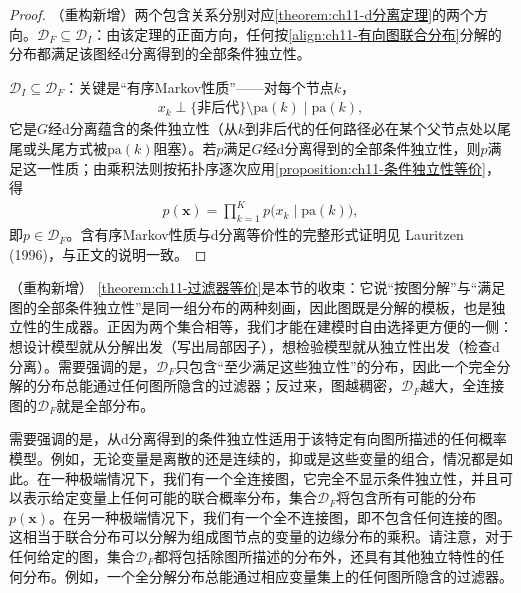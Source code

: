 \documentclass[../../main.tex]{subfiles}
\begin{document}
\begin{proof}
（重构新增）两个包含关系分别对应\cref{theorem:ch11-d分离定理}的两个方向。$\mathcal{D}_F\subseteq\mathcal{D}_I$：由该定理的正面方向，任何按\eqref{align:ch11-有向图联合分布}分解的分布都满足该图经d分离得到的全部条件独立性。

$\mathcal{D}_I\subseteq\mathcal{D}_F$：关键是“有序Markov性质”——对每个节点$k$，
\begin{align}
  x_k \perp \bigl\{\text{非后代}\bigr\}\setminus\mathrm{pa}(k) \mid \mathrm{pa}(k),
\end{align}
它是$G$经d分离蕴含的条件独立性（从$k$到非后代的任何路径必在某个父节点处以尾尾或头尾方式被$\mathrm{pa}(k)$阻塞）。若$p$满足$G$经d分离得到的全部条件独立性，则$p$满足这一性质；由乘积法则按拓扑序逐次应用\cref{proposition:ch11-条件独立性等价}，得
\begin{align}
  p(\mathbf{x})=\prod_{k=1}^{K}p\bigl(x_k\mid \mathrm{pa}(k)\bigr),
\end{align}
即$p\in\mathcal{D}_F$。含有序Markov性质与d分离等价性的完整形式证明见 Lauritzen (1996)，与正文的说明一致。
\end{proof}

\begin{remark}（重构新增）
\cref{theorem:ch11-过滤器等价}是本节的收束：它说“按图分解”与“满足图的全部条件独立性”是同一组分布的两种刻画，因此图既是分解的模板，也是独立性的生成器。正因为两个集合相等，我们才能在建模时自由选择更方便的一侧：想设计模型就从分解出发（写出局部因子），想检验模型就从独立性出发（检查d分离）。需要强调的是，$\mathcal{D}_F$只包含“至少满足这些独立性”的分布，因此一个完全分解的分布总能通过任何图所隐含的过滤器；反过来，图越稠密，$\mathcal{D}_F$越大，全连接图的$\mathcal{D}_F$就是全部分布。
\end{remark}

需要强调的是，从d分离得到的条件独立性适用于该特定有向图所描述的任何概率模型。例如，无论变量是离散的还是连续的，抑或是这些变量的组合，情况都是如此。在一种极端情况下，我们有一个全连接图，它完全不显示条件独立性，并且可以表示给定变量上任何可能的联合概率分布，集合$\mathcal{D}_F$将包含所有可能的分布$p(\mathbf{x})$。在另一种极端情况下，我们有一个全不连接图，即不包含任何连接的图。这相当于联合分布可以分解为组成图节点的变量的边缘分布的乘积。请注意，对于任何给定的图，集合$\mathcal{D}_F$都将包括除图所描述的分布外，还具有其他独立特性的任何分布。例如，一个全分解分布总能通过相应变量集上的任何图所隐含的过滤器。
\end{document}
